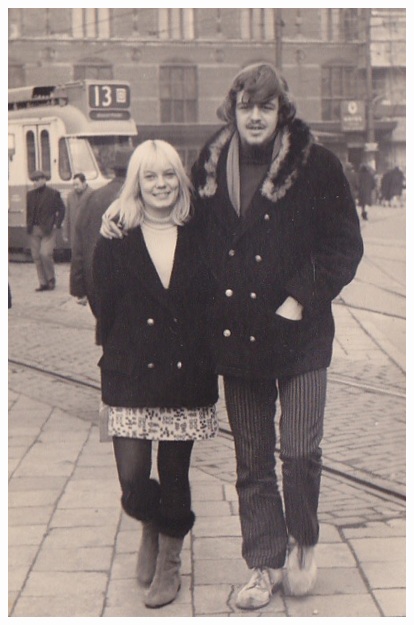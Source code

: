 \documentclass[10pt,twoside, openright]{memoir}
\begin{document}
\begin{figure}
\includegraphics[width=\textwidth]{img/ch31/jeugd}
\end{figure} 
\end{document}
